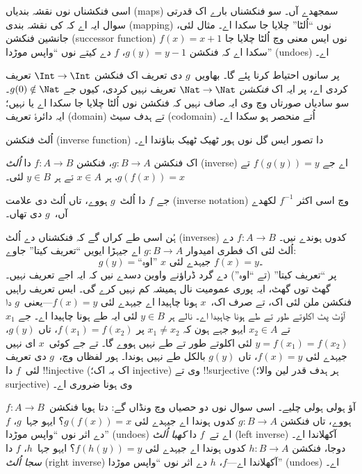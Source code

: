 \documentclass[../../../include/open-logic-section]{subfiles}
\begin{document}

\begin{explain}
اسی فنکشناں نوں نقشہ بندیاں (maps) سمجھدے آں۔ سو فنکشناں بارے اک
قدرتی سوال ایہ اے کہ کی نقشہ بندی (mapping) نوں ``اُلٹا'' چلایا جا
سکدا اے۔ مثال لئی، جانشین فنکشن (successor function)
$f(x) = x + 1$ نوں ایس معنی وچ اُلٹا چلایا جا سکدا اے کہ فنکشن
$g(y) = y - 1$، $f$ دے کیتے نوں ``واپس موڑدا'' (undoes) اے۔

پر سانوں احتیاط کرنا پئے گا۔ بھاویں~$g$ دی تعریف اک فنکشن
$\Int \to \Int$ تعریف کردی اے، پر ایہ اک \emph{فنکشن} $\Nat
\to \Nat$ تعریف نہیں کردی، کیوں جے $g(0) \notin \Nat$۔ سو سادیاں
صورتاں وچ وی ایہ صاف نہیں کہ فنکشن نوں اُلٹا چلایا جا سکدا اے یا
نہیں؛ ایہ دائرۂ تعریف (domain) تے ہدف سیٹ (codomain) اُتے منحصر
ہو سکدا اے۔

اُلٹ فنکشن (inverse function) دا تصور ایس گل نوں ہور ٹھیک ٹھیک
بناؤندا اے۔
\end{explain}

\begin{defn}
اک فنکشن $g \colon B \to A$، فنکشن $f \colon A \to B$ دا
\emph{اُلٹ} (inverse) اے جے $f(g(y)) = y$ تے $g(f(x)) = x$،
ہر $x \in A$ تے ہر $y \in B$ لئی۔
\end{defn}

جے $f$ دا اُلٹ~$g$ ہووے، تاں اُلٹ دی علامت (inverse notation) وچ
اسی اکثر $f^{-1}$ لکھدے آں،~$g$ دی تھاں۔

\begin{explain}
ہُن اسی طے کراں گے کہ فنکشناں دے اُلٹ (inverses) کدوں ہوندے نیں۔
$f\colon A \to B$ دے اُلٹ لئی اک فطری امیدوار $g\colon B \to A$
اے جیہڑا ایویں ``تعریف کیتا'' جاوے:
\[
g(y) = \text{``اوہ'' $x$ جیہدے لئی $f(x) = y$۔}
\]
پر ``تعریف کیتا'' (تے ``اوہ'') دے گرد ڈراؤنے واوین دسدے نیں کہ ایہ
اجے تعریف نہیں۔ گھٹ توں گھٹ، ایہ پوری عمومیت نال ہمیشہ کم نہیں
کرے گی۔ ایس تعریف راہیں فنکشن ملن لئی اک، تے صرف اک،~$x$ ہونا
چاہیدا اے جیہدے لئی $f(x) = y$---یعنی~$g$ دا آؤٹ پٹ اکلوتے طور
تے طے ہونا چاہیدا اے۔ نالے ہر $y \in B$ لئی ایہ طے ہونا چاہیدا اے۔
جے $x_1$ تے $x_2 \in A$ ایہو جہے ہون کہ $x_1 \neq x_2$ پر
$f(x_1) = f(x_2)$، تاں $g(y)$، $y = f(x_1) = f(x_2)$ لئی اکلوتے
طور تے طے نہیں ہووے گا۔ تے جے کوئی~$x$ ای نہیں جیہدے لئی
$f(x) = y$، تاں $g(y)$ بالکل طے نہیں ہوندا۔ ہور لفظاں وچ،~$g$ دی
تعریف لئی~$f$ دا !!{injective} (اک بہ اک؛ injective) وی تے
!!{surjective} (ہر ہدف قدر لین والا؛ surjective) وی ہونا ضروری اے۔

آؤ ہولی ہولی چلیے۔ اسی سوال نوں دو حصیاں وچ ونڈاں گے: دتا ہویا
فنکشن~$f\colon A \to B$ ہووے، تاں فنکشن $g\colon B \to A$ کدوں
ہوندا اے جیہدے لئی $g(f(x)) = x$؟ ایہو جہا~$g$، $f$ دے اثر نوں
``واپس موڑدا'' (undoes) اے تے~$f$ دا \emph{کھبا اُلٹ}
(left inverse) آکھلاندا اے۔ دوجا،
فنکشن $h\colon B \to A$ کدوں ہوندا اے جیہدے لئی $f(h(y)) = y$؟
ایہو جہا~$h$، $f$ دا \emph{سجا اُلٹ} (right inverse) آکھلاندا
اے---$f$، $h$ دے اثر نوں ``واپس موڑدا'' (undoes) اے۔
\end{explain}
\end{document}
